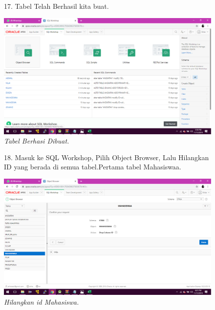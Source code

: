 \begin{enumerate}
\begin{figure}
\item[17.]Tabel Telah Berhasil kita buat.
    \begin{center}
    \includegraphics[scale=0.3]{figures/23.png}
    \caption{\textit{Tabel Berhasi Dibuat.}}
    \end{center}
    \label{gambar}
    \end{figure}

\begin{figure}
\item[18.]Masuk ke SQL Workshop, Pilih Object Browser, Lalu Hilangkan ID yang berada di semua tabel.Pertama tabel Mahasiswaa.
    \begin{center}
    \includegraphics[scale=0.3]{figures/25.png}
    \caption{\textit{Hilangkan id Mahasiswa.}}
    \end{center}
    \label{gambar}
    \end{figure}


\end{enumerate}
